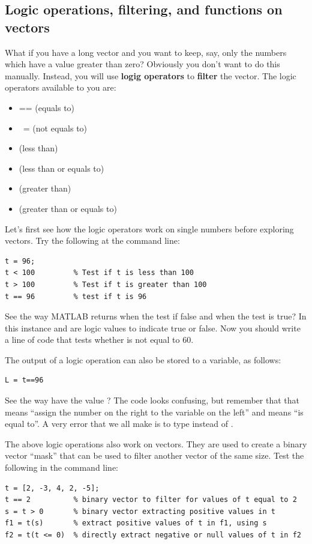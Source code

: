 \documentclass{article}
\begin{document}
\subsection{Logic operations, filtering, and functions on vectors}

What if you have a long vector and you want to keep, say, only the numbers which have a value greater than zero?
Obviously you don't want to do this manually. 
Instead, you will use \textbf{logig operators} to \textbf{filter} the vector. 
The logic operators available to you are:
\begin{itemize}
\item {==} (equals to)
\item {~=} (not equals to)
\item \mcode{<} (less than)
\item \mcode{<=} (less than or equals to)
\item \mcode{>} (greater than)
\item \mcode{>=} (greater than or equals to)
\end{itemize}

Let's first see how the logic operators work on single numbers before exploring vectors. 
Try the following at the command line:
\begin{lstlisting}
t = 96;
t < 100         % Test if t is less than 100
t > 100         % Test if t is greater than 100
t == 96         % test if t is 96
\end{lstlisting}

See the way MATLAB returns  when the test if false and  when the test is true? 
In this instance  and  are logic values to indicate true or false. 
Now you should write a line of code that tests whether  is not equal to 60.

The output of a logic operation can also be stored to a variable, as follows:

\begin{lstlisting}
L = t==96
\end{lstlisting}

See the way  have the value ?
The code looks confusing, but remember that that \mcode{=} means ``assign the number on the right to the variable on the left'' and \mcode{==} means ``is equal to''.
A very error that we all make is to type  instead of .

The above logic operations also work on vectors. 
They are used to create a binary vector ``mask'' that can be used to filter another vector of the same size.
Test the following in the command line:
\begin{lstlisting}
t = [2, -3, 4, 2, -5];
t == 2          % binary vector to filter for values of t equal to 2
s = t > 0       % binary vector extracting positive values in t
f1 = t(s)       % extract positive values of t in f1, using s
f2 = t(t <= 0)  % directly extract negative or null values of t in f2
\end{lstlisting}
\end{document}
